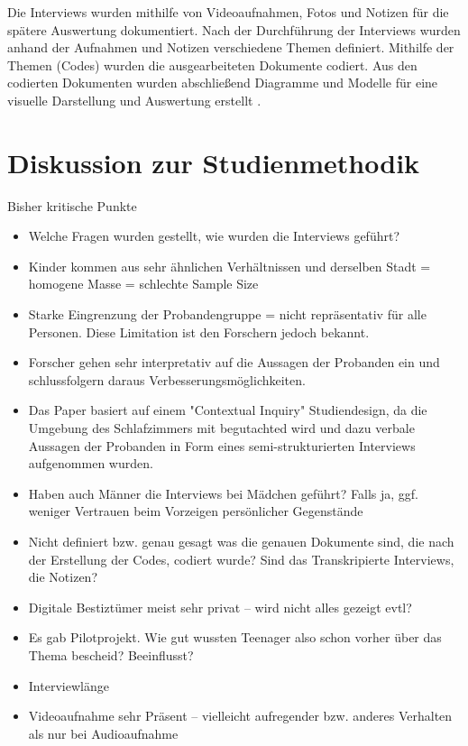 \documentclass{hsflensburg}
\begin{document}
	Die Interviews wurden mithilfe von Videoaufnahmen, Fotos und Notizen für die spätere Auswertung dokumentiert. Nach der Durchführung
	der Interviews wurden anhand der Aufnahmen und Notizen verschiedene Themen
	definiert. Mithilfe der Themen (Codes) wurden die ausgearbeiteten
	Dokumente codiert. Aus den codierten Dokumenten wurden abschließend Diagramme und Modelle für eine visuelle Darstellung und Auswertung erstellt  \cite{odom2011teenagers}. 

	\section{Diskussion zur Studienmethodik}

	Bisher kritische Punkte

	\begin{itemize}
	\item Welche Fragen wurden gestellt, wie wurden die Interviews geführt?
	\item Kinder kommen aus sehr ähnlichen Verhältnissen und derselben Stadt = homogene Masse = schlechte Sample Size
	\item Starke Eingrenzung der Probandengruppe = nicht repräsentativ für alle Personen. Diese Limitation ist den Forschern jedoch bekannt.
	\item Forscher gehen sehr interpretativ auf die Aussagen der Probanden ein und schlussfolgern daraus Verbesserungsmöglichkeiten.
	\item Das Paper basiert auf einem "Contextual Inquiry" Studiendesign, da die Umgebung des Schlafzimmers mit begutachted wird und dazu verbale Aussagen der Probanden in Form eines semi-strukturierten Interviews aufgenommen wurden.
	\item Haben auch Männer die Interviews bei Mädchen geführt? Falls ja, ggf. weniger Vertrauen beim Vorzeigen persönlicher Gegenstände
	\item Nicht definiert bzw. genau gesagt was die genauen Dokumente sind, die nach der Erstellung der Codes, codiert wurde? Sind
		das Transkripierte Interviews, die Notizen?
		\item Digitale Bestiztümer meist sehr privat – wird nicht alles gezeigt evtl?
		\item Es gab Pilotprojekt. Wie gut wussten Teenager also schon vorher über das Thema bescheid? Beeinflusst?
		\item Interviewlänge
		\item Videoaufnahme sehr Präsent – vielleicht aufregender bzw. anderes Verhalten als nur bei Audioaufnahme
	\end{itemize}
	

	\clearpage
	\nocite{*}	
	
	
\end{document}
